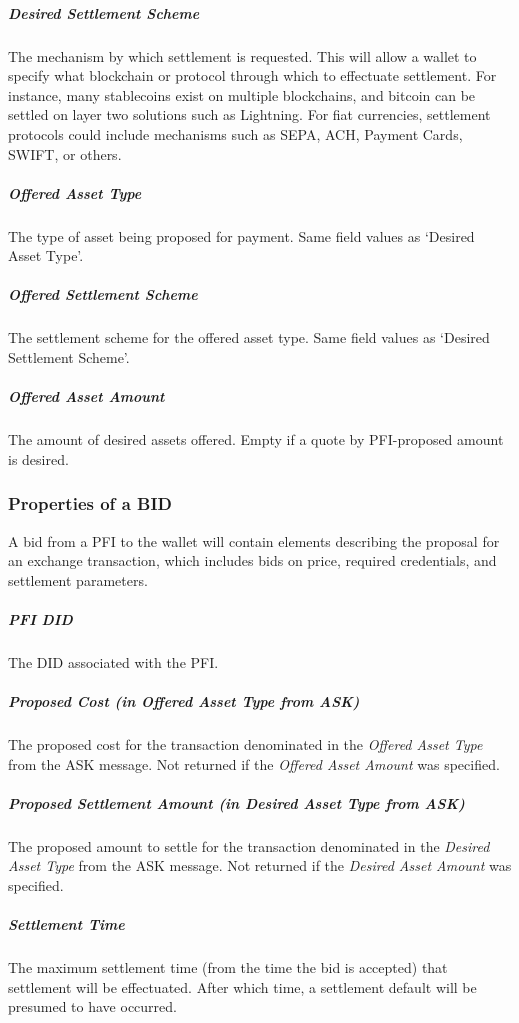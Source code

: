 \documentclass[11pt]{article}
\begin{document}
\subparagraph{Desired Settlement Scheme}

The mechanism by which settlement is requested. This will allow a wallet to specify what blockchain or protocol through which to effectuate settlement. For instance, many stablecoins exist on multiple blockchains, and bitcoin can be settled on layer two solutions such as Lightning. For fiat currencies, settlement protocols could include mechanisms such as SEPA, ACH, Payment Cards, SWIFT, or others.

\subparagraph{Offered Asset Type}

The type of asset being proposed for payment. Same field values as ‘Desired Asset Type’.

\subparagraph{Offered Settlement Scheme}

The settlement scheme for the offered asset type. Same field values as ‘Desired Settlement Scheme’.

\subparagraph{Offered Asset Amount}

The amount of desired assets offered. Empty if a quote by PFI-proposed amount is desired. 

\vspace{1\baselineskip}
\subsubsection{Properties of a BID}

A bid from a PFI to the wallet will contain elements describing the proposal for an exchange transaction, which includes bids on price, required credentials, and settlement parameters. 

\subparagraph{PFI DID}

The DID associated with the PFI. 

\subparagraph{Proposed Cost (in Offered Asset Type from ASK)}

The proposed cost for the transaction denominated in the \textit{Offered Asset Type} from the ASK message. Not returned if the \textit{Offered Asset Amount} was specified. 

\subparagraph{Proposed Settlement Amount (in Desired Asset Type from ASK)}

The proposed amount to settle for the transaction denominated in the \textit{Desired Asset Type} from the ASK message. Not returned if the \textit{Desired Asset Amount} was specified. 

\subparagraph{Settlement Time}

The maximum settlement time (from the time the bid is accepted) that settlement will be effectuated. After which time, a settlement default will be presumed to have occurred. 
\end{document}
